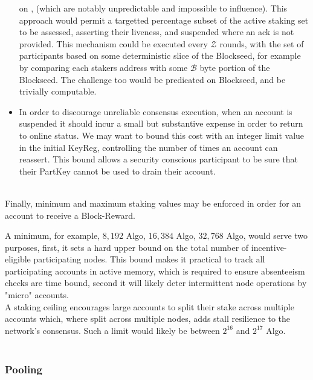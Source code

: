 \documentclass[11pt,a4paper]{article}
\begin{document}
\begin{itemize}
          on , (which are notably unpredictable and impossible to influence). This approach would 
          permit a targetted percentage subset of the active staking set to be assessed, asserting their liveness, and
          suspended where an ack is not provided. This mechanism could be executed every \(\mathcal{Z}\) rounds, with 
          the set of participants based on some deterministic slice of the \gls{Blockseed}, for example by comparing 
          each stakers address with some \(\mathcal{B}\) byte portion of the \gls{Blockseed}. The challenge too would be 
          predicated on \gls{Blockseed}, and be trivially computable.
    \item In order to discourage unreliable consensus execution, when an account is suspended it should incur a small
          but substantive expense in order to return to online status. We may want to bound this cost with an 
          integer limit value in the initial \gls{KeyReg}, controlling the number of times an account can reassert. This
          bound allows a security conscious participant to be sure that their \gls{PartKey} cannot be used to drain
          their account.

\end{itemize} \mbox{} \\

Finally, minimum and maximum staking values may be enforced in order for an account to receive a \gls{Block-Reward}.

A minimum, for example, $8,192$ Algo, $16,384$ Algo, $32,768$ Algo, would serve two purposes, first, it sets a hard
upper bound on the total number of incentive-eligible participating nodes. This bound makes it practical to track all 
participating accounts in active memory, which is required to ensure absenteeism checks are time bound, second it will 
likely deter intermittent node operations by "micro" accounts. \\ 

A staking ceiling encourages large accounts to split their stake across multiple accounts which, where split across
multiple nodes, adds stall resilience to the network's consensus. Such a limit would likely be between $2^{16}$ and
$2^{17}$ Algo. \\ \\

\pagebreak

\subsubsection{Pooling}
\end{document}
